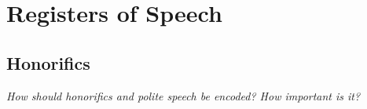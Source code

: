 \documentclass[grammar]{subfiles}
\begin{document}
	\chapter{Registers of Speech}
	\label{ch:registers}

	\section{Honorifics}
	\label{sec:reg_honorifics}

	\emph{How should honorifics and polite speech be encoded? How important is it?}
	
\end{document}
